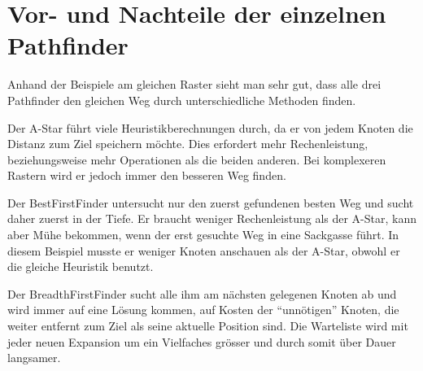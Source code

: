 \section{Vor- und Nachteile der einzelnen Pathfinder}

Anhand der Beispiele am gleichen Raster sieht man sehr gut, dass alle
drei Pathfinder den gleichen Weg durch unterschiedliche Methoden finden.

Der A-Star führt viele Heuristikberechnungen durch, da er von jedem
Knoten die Distanz zum Ziel speichern möchte. Dies erfordert mehr
Rechenleistung, beziehungsweise mehr Operationen als die beiden anderen.
Bei komplexeren Rastern wird er jedoch immer den besseren Weg finden.

Der BestFirstFinder untersucht nur den zuerst gefundenen besten Weg und
sucht daher zuerst in der Tiefe. Er braucht weniger Rechenleistung als
der A-Star, kann aber Mühe bekommen, wenn der erst gesuchte Weg in eine
Sackgasse führt. In diesem Beispiel musste er weniger Knoten anschauen
als der A-Star, obwohl er die gleiche Heuristik benutzt.

Der BreadthFirstFinder sucht alle ihm am nächsten gelegenen Knoten ab
und wird immer auf eine Lösung kommen, auf Kosten der ``unnötigen''
Knoten, die weiter entfernt zum Ziel als seine aktuelle Position sind. Die
Warteliste wird mit jeder neuen Expansion um ein Vielfaches grösser und
durch somit über Dauer langsamer.
